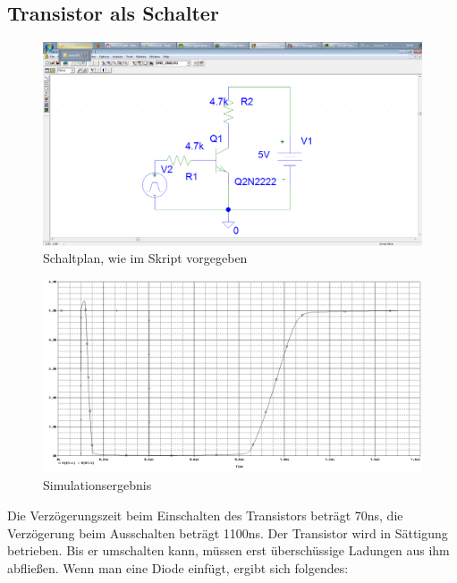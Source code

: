 \subsection{Transistor als Schalter}
\begin{figure}[H]
	\centering
	\includegraphics[width=\linewidth]{versuch5/spice/s5411.png}
	\caption{Schaltplan, wie im Skript vorgegeben}
\end{figure}
\begin{figure}[H]
	\centering
	\includegraphics[width=\linewidth]{versuch5/spice/5411.png}
	\caption{Simulationsergebnis}
\end{figure}
Die Verzögerungszeit beim Einschalten des Transistors beträgt 70ns, die Verzögerung beim Ausschalten beträgt 1100ns. Der Transistor wird in Sättigung betrieben. Bis er umschalten kann, müssen erst überschüssige Ladungen aus ihm abfließen. Wenn man eine Diode einfügt, ergibt sich folgendes:
